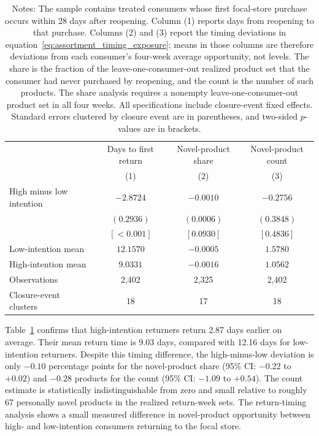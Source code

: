 \documentclass[11 pt]{article}
\newcommand\fnote[1]{\captionsetup{font=footnotesize}\caption*{#1}}
\begin{document}
\begin{table}[H]
\centering
\caption{Return timing and personally novel product opportunity}
\label{tab:appendix_reopening_assortment_timing}
\small
\begin{tabularx}{\textwidth}{Xccc}
\toprule
& Days to first return & Novel-product share & Novel-product count \\
& (1) & (2) & (3) \\
\midrule
High minus low intention & $-2.8724$ & $-0.0010$ & $-0.2756$ \\
& $(0.2936)$ & $(0.0006)$ & $(0.3848)$ \\
& $[<0.001]$ & $[0.0930]$ & $[0.4836]$ \\
\addlinespace
Low-intention mean & $12.1570$ & $-0.0005$ & $1.5780$ \\
High-intention mean & $9.0331$ & $-0.0016$ & $1.0562$ \\
Observations & 2,402 & 2,325 & 2,402 \\
Closure-event clusters & 18 & 17 & 18 \\
\bottomrule
\end{tabularx}
\vspace{1mm}
\fnote{Notes: The sample contains treated consumers whose first focal-store purchase occurs within 28 days after reopening. Column (1) reports days from reopening to that purchase. Columns (2) and (3) report the timing deviations in equation~\eqref{eq:assortment_timing_exposure}; means in those columns are therefore deviations from each consumer's four-week average opportunity, not levels. The share is the fraction of the leave-one-consumer-out realized product set that the consumer had never purchased by reopening, and the count is the number of such products. The share analysis requires a nonempty leave-one-consumer-out product set in all four weeks. All specifications include closure-event fixed effects. Standard errors clustered by closure event are in parentheses, and two-sided $p$-values are in brackets.}
\end{table}

Table~\ref{tab:appendix_reopening_assortment_timing} confirms that high-intention returners return 2.87 days earlier on average. Their mean return time is 9.03 days, compared with 12.16 days for low-intention returners. Despite this timing difference, the high-minus-low deviation is only $-0.10$ percentage points for the novel-product share (95\% CI: $-0.22$ to $+0.02$) and $-0.28$ products for the count (95\% CI: $-1.09$ to $+0.54$). The count estimate is statistically indistinguishable from zero and small relative to roughly 67 personally novel products in the realized return-week sets. The return-timing analysis shows a small measured difference in novel-product opportunity between high- and low-intention consumers returning to the focal store.
\end{document}
